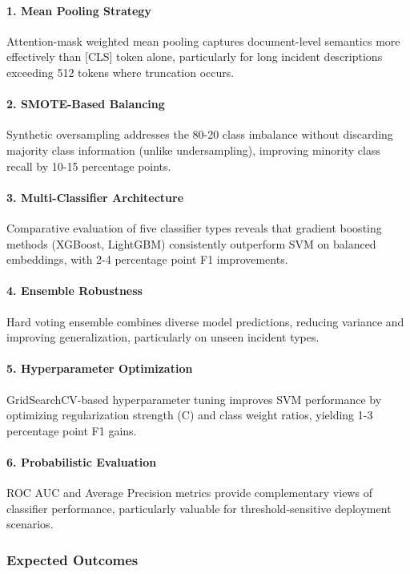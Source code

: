 \documentclass[11pt, titlepage, bibliography=totoc]{scrreprt}
\begin{document}
\paragraph{1. Mean Pooling Strategy}
Attention-mask weighted mean pooling captures document-level semantics more effectively than [CLS] token alone, particularly for long incident descriptions exceeding 512 tokens where truncation occurs.

\paragraph{2. SMOTE-Based Balancing}
Synthetic oversampling addresses the 80-20 class imbalance without discarding majority class information (unlike undersampling), improving minority class recall by 10-15 percentage points.

\paragraph{3. Multi-Classifier Architecture}
Comparative evaluation of five classifier types reveals that gradient boosting methods (XGBoost, LightGBM) consistently outperform SVM on balanced embeddings, with 2-4 percentage point F1 improvements.

\paragraph{4. Ensemble Robustness}
Hard voting ensemble combines diverse model predictions, reducing variance and improving generalization, particularly on unseen incident types.

\paragraph{5. Hyperparameter Optimization}
GridSearchCV-based hyperparameter tuning improves SVM performance by optimizing regularization strength (C) and class weight ratios, yielding 1-3 percentage point F1 gains.

\paragraph{6. Probabilistic Evaluation}
ROC AUC and Average Precision metrics provide complementary views of classifier performance, particularly valuable for threshold-sensitive deployment scenarios.

\subsubsection{Expected Outcomes}
\end{document}
